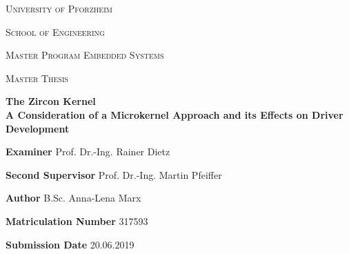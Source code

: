\documentclass[a4paper, twoside, 12pt]{book}
\begin{document}
\frontmatter

\begin{titlepage}
{
\centering
\textsc{\LARGE University of Pforzheim} \par 
\vspace{0.3cm}
\textsc{\LARGE School of Engineering} \par 
\vspace{1.0cm}
\textsc{\Large Master Program Embedded Systems} \par 
\vspace{3.0cm}
\textsc{\Large Master Thesis} \par 
\vspace{1.0cm}
\huge\textbf{The Zircon Kernel \\ A Consideration of a Microkernel Approach and its Effects on Driver Development} \par 
\vspace{4.3cm}
\Large 
}

\textbf{Examiner} \hfill Prof. Dr.-Ing. Rainer Dietz \par %
\textbf{Second Supervisor} \hfill Prof. Dr.-Ing. Martin Pfeiffer \par %
\textbf{Author} \hfill B.Sc. Anna-Lena Marx \par 
\textbf{Matriculation Number} \hfill 317593 \par
\vspace{2.0cm}
\textbf{Submission Date} \hfill 20.06.2019


\end{titlepage}

%


\newpage




\pagestyle {headings}
\quad
\newpage
% 
\newpage
\quad
\newpage
%


\tableofcontents
\newpage

\mainmatter


% 
% 
% 
% 
% 
% 
%


\newpage \appendix

%

\nocite{*}
\printbibliography

% 
\listoflistings
\listoffigures
\listoftables
\end{document}
